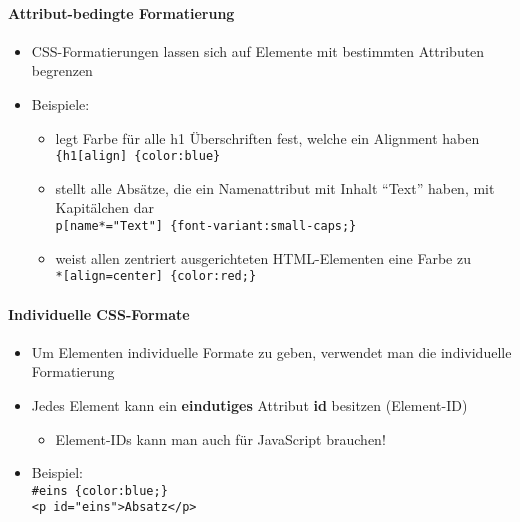 \paragraph{Attribut-bedingte Formatierung}
\begin{itemize}[noitemsep,topsep=0pt,leftmargin=*]
    \item CSS-Formatierungen lassen sich auf Elemente mit bestimmten Attributen begrenzen
    \item Beispiele:
    \begin{itemize}[noitemsep,topsep=0pt,leftmargin=*]
        \item legt Farbe für alle h1 Überschriften fest, welche ein Alignment haben\\
        \verb|{h1[align] {color:blue}|
        \item stellt alle Absätze, die ein Namenattribut mit Inhalt "`Text"' haben, mit Kapitälchen dar\\
        \verb|p[name*="Text"] {font-variant:small-caps;}|
        \item weist allen zentriert ausgerichteten HTML-Elementen eine Farbe zu\\
        \verb|*[align=center] {color:red;}|
    \end{itemize}
\end{itemize}

\paragraph{Individuelle CSS-Formate}
\begin{itemize}[noitemsep,topsep=0pt,leftmargin=*]
    \item Um Elementen individuelle Formate zu geben, verwendet man die individuelle Formatierung
    \item Jedes Element kann ein \textbf{eindutiges} Attribut \textbf{id} besitzen (Element-ID)
    \begin{itemize}[noitemsep,topsep=0pt,leftmargin=*]
        \item Element-IDs kann man auch für JavaScript brauchen!
    \end{itemize}
    \item Beispiel:\\
    \verb|#eins {color:blue;}|\\
    \verb|<p id="eins">Absatz</p>|
\end{itemize}

